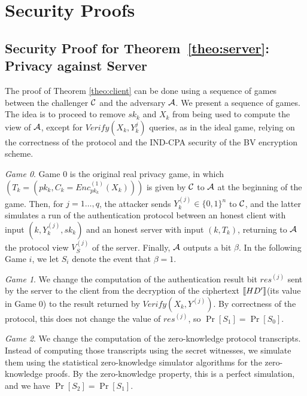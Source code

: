 \section{Security Proofs}
\label{append:Proofs}
\subsection{Security Proof for Theorem~\ref{theo:server}: Privacy against Server}
\label{append:ProofsPrivacy }

The proof of Theorem \ref{theo:client} can be done using a sequence of games between the challenger $\mathcal{C}$ and
the adversary $\mathcal{A}$. We present a sequence of games. The idea is to proceed to remove $sk_k$ and $X_k$ from being
used to compute the view of $\mathcal{A}$, except for $Verify(X_k,Y_k^{j})$ queries, as in the ideal game, relying on the
correctness of the protocol and the IND-CPA security of the BV encryption scheme.

\textit{Game 0}. Game 0 is the original real privacy game, in which $(T_k =(pk_k, C_k = Enc^{(1)}_{pk_k}(X_k)))$ is
given by $\mathcal{C}$ to $\mathcal{A}$ at the beginning of the game. Then, for $j=1\ldots,q$, the attacker sends
$Y_k^{(j)} \in \{0,1\}^n$ to $\mathcal{C}$, and the latter simulates a run of the authentication protocol between an
honest client with input $(k,Y_k^{(j)}, sk_k)$ and an honest server with input $(k,T_k)$, returning to $\mathcal{A}$ the
protocol view $V^{(j)}_S$ of the server. Finally, $\mathcal{A}$ outputs a bit $\beta$. In the following Game $i$, we let
$S_i$ denote the event that $\beta=1$.

\textit{Game 1}. We change the computation of the authentication result bit $res^{(j)}$ sent by the server to the client
from the decryption of the ciphertext \(\left\llbracket HD'\right\rrbracket\)(its value in Game 0) to the result returned by $Verify(X_k,
Y^{(j)})$. By correctness of the protocol, this does not change the value of $res^{(j)}$, so $\Pr[S_1] = \Pr[S_0]$.

\textit{Game 2}. We change the computation of the zero-knowledge protocol transcripts. Instead of computing those
transcripts using the secret witnesses, we simulate them using the statistical zero-knowledge simulator algorithms for
the zero-knowledge proofs. By the zero-knowledge property, this is a perfect simulation, and we have $\Pr[S_2]=
\Pr[S_1]$.

